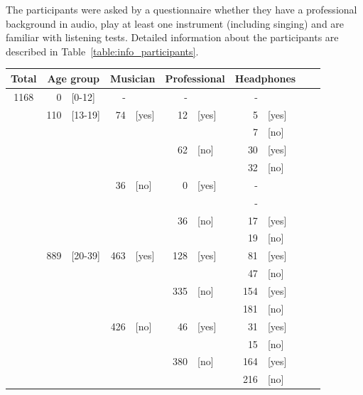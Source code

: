 The participants were asked by a questionnaire whether they have a professional background in audio, play at least one instrument (including singing) and are familiar with listening tests. Detailed information about the participants are described in Table~\ref{table:info_participants}.
\begin{table}[htb]
\center
\scriptsize
\renewcommand{\arraystretch}{1.2}
\begin{tabular*}{0.45\textwidth}{c r@{ }l r@{ }l r@{ }l r@{ }l r@{ }l}
\toprule[1.5pt]
Total & \multicolumn{2}{c}{Age group} & \multicolumn{2}{c}{Musician} & \multicolumn{2}{c}{Professional} & \multicolumn{2}{c}{Headphones} \\
\midrule
1168 &  0  & [0-12]  & -   &  	   & -   &       & -   &       \\
 	 \cline{2-9} \rule{0pt}{10pt}
     & 110 & [13-19] & 74  & [yes] & 12  & [yes] & 5   & [yes] \\
     &     &         &	   &       &     &       & 7   & [no]  \\
     &     &   		 &     &       & 62  & [no]  & 30  & [yes] \\
     &     &         &	   &       &     &       & 32  & [no]  \\
     &     &   		 & 36  & [no]  & 0   & [yes] & -   &       \\
     &     &         &	   &       &     &       & -   &       \\
     &     &   		 &     &       & 36  & [no]  & 17  & [yes] \\
     &     &         &	   &       &     &       & 19  & [no]  \\
     \cline{2-9} \rule{0pt}{10pt}
     & 889 & [20-39] & 463 & [yes] & 128 & [yes] & 81   & [yes] \\
     &     &         &	   &       &     &       & 47   & [no]  \\
     &     &   		 &     &       & 335 & [no]  & 154  & [yes] \\
     &     &         &	   &       &     &       & 181  & [no]  \\
     &     &   		 & 426 & [no]  & 46  & [yes] & 31   & [yes] \\
     &     &         &	   &       &     &       & 15   & [no]  \\
     &     &   		 &     &       & 380 & [no]  & 164  & [yes] \\
     &     &         &	   &       &     &       & 216  & [no]  \\

\end{tabular*}
\end{table}
